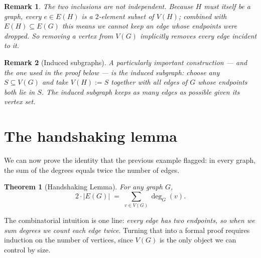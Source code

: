 \documentclass[11pt]{article}
\theoremstyle{defstyle}
\theoremstyle{thmstyle}
\newtheorem{theorem}{Theorem}[section]
\theoremstyle{notstyle}
\newtheorem*{remark}{Remark}
\theoremstyle{cautionstyle}
\begin{document}
\begin{notebox}
\begin{remark}
The two inclusions are not independent. Because $H$ must itself be a graph,
every $e \in E(H)$ is a $2$-element subset of $V(H)$; combined with
$E(H) \subseteq E(G)$ this means we cannot keep an edge whose endpoints
were dropped. So removing a vertex from $V(G)$ implicitly removes every
edge incident to it.
\end{remark}
\end{notebox}

\begin{notebox}
\begin{remark}[Induced subgraphs]
A particularly important construction --- and the one used in the proof
below --- is the \emph{induced subgraph}: choose any $S \subseteq V(G)$
and take $V(H) := S$ together with all edges of $G$ whose endpoints
both lie in $S$. The induced subgraph keeps as many edges as possible
given its vertex set.
\end{remark}
\end{notebox}

\section{The handshaking lemma}

We can now prove the identity that the previous example flagged: in every
graph, the sum of the degrees equals twice the number of edges.

\begin{thmbox}
\begin{theorem}[Handshaking Lemma]
For any graph $G$,
\[
  2 \cdot |E(G)| \;=\; \sum_{v \in V(G)} \deg_G(v).
\]
\end{theorem}
\end{thmbox}

\noindent
The combinatorial intuition is one line: \emph{every edge has two
endpoints, so when we sum degrees we count each edge twice}. Turning that
into a formal proof requires induction on the number of vertices, since
$V(G)$ is the only object we can control by size.
\end{document}
